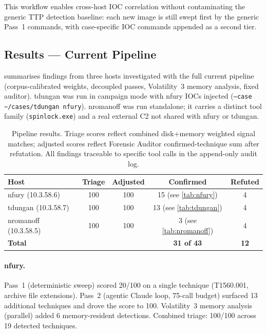\documentclass[sigconf, nonacm]{acmart}
\begin{document}
This workflow enables cross-host IOC correlation without contaminating
the generic TTP detection baseline: each new image is still swept first
by the generic Pass~1 commands, with case-specific IOC commands appended
as a second tier.

\subsection{Results — Current Pipeline}

 summarises findings from three hosts investigated
with the full current pipeline (corpus-calibrated weights, decoupled
passes, Volatility~3 memory analysis, fixed auditor). tdungan was
run in campaign mode with nfury IOCs injected
(\texttt{--case \textasciitilde/cases/tdungan nfury}).
nromanoff was run standalone; it carries a distinct tool family
(\texttt{spinlock.exe}) and a real external C2 not shared with nfury or tdungan.

\begin{table}[!ht]
\centering
\caption{Pipeline results. Triage scores reflect combined disk+memory
  weighted signal matches; adjusted scores reflect Forensic Auditor
  confirmed-technique sum after refutation. All findings traceable to
  specific tool calls in the append-only audit log.}
\label{tab:results}
\begin{tabular}{@{}lcccc@{}}
\toprule
Host & Triage & Adjusted & Confirmed & Refuted \\
\midrule
nfury (10.3.58.6)      & 100 & 100 & 15 (see \cref{tab:nfury})      &  4 \\
tdungan (10.3.58.7)    & 100 & 100 & 13 (see \cref{tab:tdungan})   &  4 \\
nromanoff (10.3.58.5)  & 100 & 100 &  3 (see \cref{tab:nromanoff}) &  4 \\
\midrule
\textbf{Total}         &     &     & \textbf{31 of 43}             & \textbf{12} \\
\bottomrule
\end{tabular}
\end{table}

\paragraph{nfury.}
Pass~1 (deterministic sweep) scored 20/100 on a single technique
(T1560.001, archive file extensions). Pass~2 (agentic Claude loop,
75-call budget) surfaced 13 additional techniques and drove the score
to 100. Volatility~3 memory analysis (parallel) added 6 memory-resident
detections. Combined triage: 100/100 across 19 detected techniques.
\end{document}
